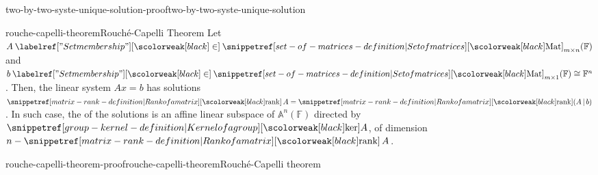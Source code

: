 \documentclass[preview]{standalone}
\begin{document}
\begin{snippetproof}{two-by-two-syste-unique-solution-proof}{two-by-two-syste-unique-solution}{}
\end{snippetproof}

\begin{snippettheorem}{rouche-capelli-theorem}{Rouché-Capelli Theorem}
    Let \(A \in \matrices_{m\times n}(\mathbb{F})\) and \(b\in \matrices_{m\times 1}(\mathbb{F}) \cong \mathbb{F}^n\). %
    Then, the linear system \(Ax = b\) has solutions \ifandonlyif \(\mrank A = \mrank (A \,|\, b)\).
    In such case, the \vectorspace of the solutions is an affine linear subspace of \(\mathbb{A}^n(\mathbb{F})\)
    directed by \(\grpker A\), of dimension \(n - \mrank A\).
\end{snippettheorem}

\begin{snippetproof}{rouche-capelli-theorem-proof}{rouche-capelli-theorem}{Rouché-Capelli theorem}
    \todo
\end{snippetproof}
\end{document}
